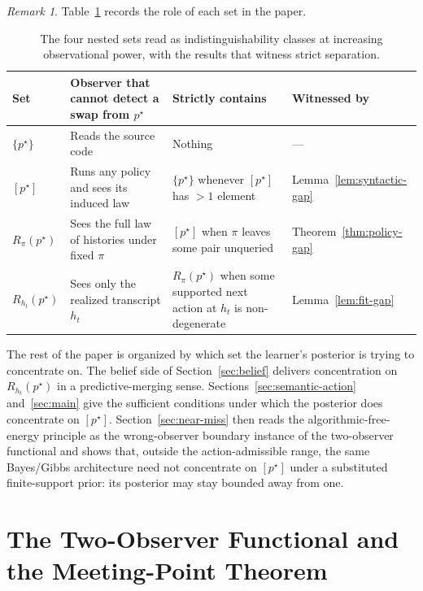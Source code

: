 \documentclass[11pt]{article}
\theoremstyle{definition}
\theoremstyle{remark}
\newtheorem{remark}[theorem]{Remark}
\begin{document}
\begin{remark}
Table~\ref{tab:hierarchy} records the role of each set in the paper.
\end{remark}

\begin{table}[ht]
\centering
\small
\caption{The four nested sets read as indistinguishability classes at increasing observational power, with the results that witness strict separation.}
\label{tab:hierarchy}
\begin{tabularx}{\textwidth}{@{}>{\raggedright\arraybackslash}p{}>{\raggedright\arraybackslash}p{}>{\raggedright\arraybackslash}X>{\raggedright\arraybackslash}p{}@{}}
\toprule
\textbf{Set} & \textbf{Observer that cannot detect a swap from $p^\star$} & \textbf{Strictly contains} & \textbf{Witnessed by} \\
\midrule
$\{p^\star\}$ & Reads the source code & Nothing & --- \\
$[p^\star]$ & Runs any policy and sees its induced law & $\{p^\star\}$ whenever $[p^\star]$ has $>1$ element & Lemma~\ref{lem:syntactic-gap} \\
$R_\pi(p^\star)$ & Sees the full law of histories under fixed $\pi$ & $[p^\star]$ when $\pi$ leaves some pair unqueried & Theorem~\ref{thm:policy-gap} \\
$R_{h_t}(p^\star)$ & Sees only the realized transcript $h_t$ & $R_\pi(p^\star)$ when some supported next action at $h_t$ is non-degenerate & Lemma~\ref{lem:fit-gap} \\
\bottomrule
\end{tabularx}
\end{table}

The rest of the paper is organized by which set the learner's posterior is trying to concentrate on. The belief side of Section~\ref{sec:belief} delivers concentration on $R_{h_t}(p^\star)$ in a predictive-merging sense. Sections~\ref{sec:semantic-action} and~\ref{sec:main} give the sufficient conditions under which the posterior does concentrate on $[p^\star]$. Section~\ref{sec:near-miss} then reads the algorithmic-free-energy principle as the wrong-observer boundary instance of the two-observer functional and shows that, outside the action-admissible range, the same Bayes/Gibbs architecture need not concentrate on $[p^\star]$ under a substituted finite-support prior: its posterior may stay bounded away from one.

\section{The Two-Observer Functional and the Meeting-Point Theorem}
\label{sec:functional}
\end{document}
